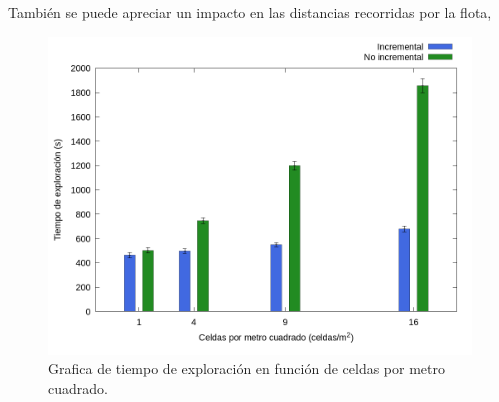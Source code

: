 También se puede apreciar un impacto en las distancias recorridas por la flota,








\begin{figure}[H]
  \centerfloat

  \includegraphics[clip=true, width=\graphlen]{imagenes/graficas_chicas/graficas_histo_num/incrementalidad/exploration_time.png}

  \caption{Grafica de tiempo de exploración en función de celdas por metro cuadrado.}\label{fig:gra:inc:et}

\end{figure}

